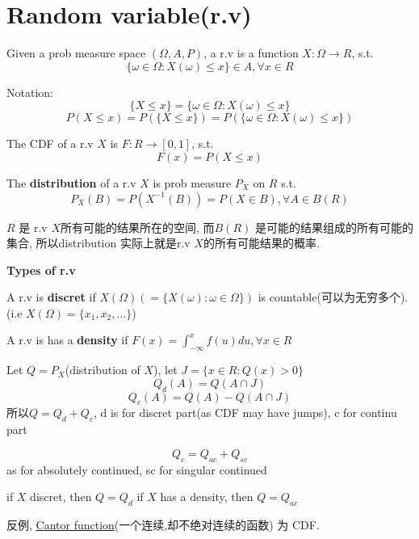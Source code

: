 \documentclass{article}
\begin{document}
\section{Random variable(r.v)}
\begin{definition}
Given a prob measure space $(\Omega, A, P)$, a r.v is a function $X: \Omega \rightarrow R$, s.t.
$$\{\omega \in \Omega: X(\omega) \leq x\} \in A, \forall x \in R$$
\end{definition}

Notation:\\
$$\{X \leq x\} = \{\omega \in \Omega: X(\omega) \leq x\}$$
$$P(X \leq x) = P(\{X \leq x\}) = P(\{\omega \in \Omega: X(\omega) \leq x\})$$

\begin{definition}
The CDF of a r.v $X$ is $F: R \rightarrow [0,1]$, s.t.
$$F(x) = P(X \leq x)$$
\end{definition}

\begin{definition}
The \textbf{distribution} of a r.v $X$ is prob measure $P_X$ on $R$ s.t.
$$P_X(B) = P(X^{-1}(B)) = P(X \in B), \forall A \in B(R)$$
\end{definition}
$R$ 是 r.v $X$所有可能的结果所在的空间, 而$B(R)$ 是可能的结果组成的所有可能的集合, 所以distribution 实际上就是r.v $X$的所有可能结果的概率.

\textbf{Types of r.v}
\begin{definition}
A r.v is \textbf{discret} if $X(\Omega)( = \{X(\omega): \omega \in \Omega\})$ is countable(可以为无穷多个). (i.e $X(\Omega) = \{x_1, x_2,\ldots \}$)
\end{definition}

\begin{definition}
A r.v is has a \textbf{density} if $F(x) = \int_{-\infty}^x f(u)du, \forall x \in R$
\end{definition}

Let $Q = P_X$(distribution of $X$), let $J = \{x \in R: Q(x) > 0\}$
$$Q_d(A) = Q(A \cap J)$$
$$Q_c(A) = Q(A) - Q(A \cap J)$$
所以$Q = Q_d + Q_c$, d is for discret part(as CDF may have jumps), c for continu part

$$Q_c = Q_{ac} + Q_{sc}$$
as for absolutely continued, sc for singular continued

if $X$ discret, then $Q = Q_d$
if $X$ has a density, then $Q = Q_{ac}$

反例, \href{http://en.wikipedia.org/wiki/Cantor\_function}{Cantor function}(一个连续,却不绝对连续的函数) 为 CDF.
\end{document}
